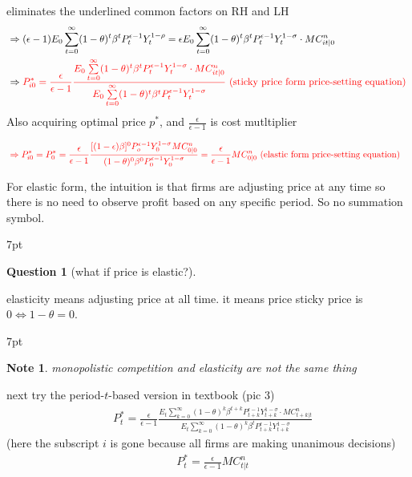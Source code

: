 \documentclass{article}
\newenvironment{blueblock}{
\def\FrameCommand{
  \hspace{1pt}
    {\color{DarkBlue}
    \vrule width 2pt}
    {\color{blueshade}
    \vrule width 4pt}
  \colorbox{blueshade}
}
\MakeFramed{
  \advance
  \hsize-
  \width
  \FrameRestore}
\noindent\hspace{-4.55pt}%
\begin{adjustwidth}{}{7pt}
\vspace{2pt}\vspace{2pt}
}
{\vspace{2pt}\end{adjustwidth}\endMakeFramed}
\newenvironment{redblock}{
\def\FrameCommand{
  \hspace{1pt}
    {\color{LightCoral}
    \vrule width 2pt}
    {\color{redshade}
    \vrule width 4pt}
  \colorbox{redshade}
}
\MakeFramed{
  \advance
  \hsize-
  \width
  \FrameRestore}
\noindent\hspace{-4.55pt}%
\begin{adjustwidth}{}{7pt}
\vspace{2pt}\vspace{2pt}
}
{\vspace{2pt}\end{adjustwidth}\endMakeFramed}
\newtheorem{question}{Question}
\newtheorem{note}{Note}
\begin{document}
eliminates the underlined common factors on RH and LH
\begin{align}
& \Rightarrow (\epsilon-1)E_{0}\sum\limits_{t=0}^{\infty}(1-\theta)^{t} \beta^{t} P_{t}^{\epsilon-1}Y_{t}^{1-\rho}=\epsilon E_{0}\sum\limits_{t=0}^{\infty}(1-\theta)^{t} \beta^{t} P_{t}^{\epsilon-1} Y_{t}^{1-\sigma} \cdot MC_{it|0}^{n}
\\& \Rightarrow \color{red} P_{i0}^{*}=\frac{\epsilon}{\epsilon-1} \frac{E_{0}\sum\limits_{t=0}^{\infty}(1-\theta)^{t} \beta^{t} P_{t}^{\epsilon-1} Y_{t}^{1-\sigma} \cdot MC_{it|0}^{n}}{E_{0}\sum\limits_{t=0}^{\infty}(1-\theta)^{t} \beta^{t} P_{t}^{\epsilon-1}Y_{t}^{1-\sigma}}
\text{ (sticky price form price-setting equation) }
\end{align}
Also acquiring optimal price $p^*$, and $\frac{\epsilon}{\epsilon-1}$ is cost mutltiplier

\begin{align}
&\color{red} \Rightarrow P_{i0}^{*}=P_{0}^{*}=\frac{\epsilon}{\epsilon-1}\frac{
[(1-\epsilon)\beta]^{0}P_{o}^{\epsilon-1}Y_{0}^{1-\sigma} MC_{0|0}^{n}
}{
(1-\theta)^{0} \beta^{0} P_{0}^{\epsilon-1}Y_{0}^{1-\sigma}
}=\frac{\epsilon}{\epsilon-1} MC^{n}_{0|0}
\text{ (elastic form price-setting equation)}
\end{align}

For elastic form, the intuition is that firms are adjusting price at any time so there is no need to observe profit based on any specific period. So no summation symbol.


\begin{redblock}
\begin{question}[what if price is elastic?]
\end{question}
elasticity means adjusting price at all time. it means price sticky price is $0 \Leftrightarrow 1- \theta =0 $.
\end{redblock}

\begin{blueblock}
\begin{note}
monopolistic competition and elasticity are not the same thing
\end{note}
\end{blueblock}

next try the period-$t$-based version in textbook (pic 3)
\begin{align}
&P_{t}^{*} =\frac{\epsilon}{\epsilon-1}\frac{E_{t}\sum\limits_{k=0}^{\infty}(1-\theta)^{k} \beta^{t+k} P_{t+k}^{\epsilon-1} Y_{t+k}^{1-\sigma} \cdot MC_{t+k|t}^{n}}{E_{t}\sum\limits_{k=0}^{\infty}(1-\theta)^{k} \beta^{t} P_{t+k}^{\epsilon-1}Y_{t+k}^{1-\sigma}}
\end{align}
(here the subscript $i$ is gone because all firms are making unanimous decisions)
\begin{align}
& P_{t}^{*}=\frac{\epsilon}{\epsilon-1} MC_{t|t}^{n}
\end{align}
\end{document}

